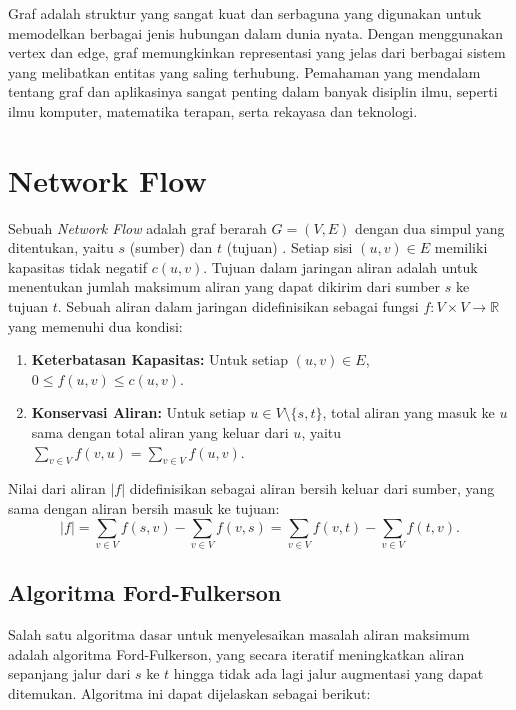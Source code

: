 Graf adalah struktur yang sangat kuat dan serbaguna yang digunakan untuk memodelkan berbagai jenis hubungan dalam dunia nyata. Dengan menggunakan vertex dan edge, graf memungkinkan representasi yang jelas dari berbagai sistem yang melibatkan entitas yang saling terhubung. Pemahaman yang mendalam tentang graf dan aplikasinya sangat penting dalam banyak disiplin ilmu, seperti ilmu komputer, matematika terapan, serta rekayasa dan teknologi.



\section{Network Flow}
\label{subsec:networkflow}

Sebuah \emph{Network Flow} adalah graf berarah \( G = (V, E) \) dengan dua simpul yang ditentukan, yaitu \( s \) (sumber) dan \( t \) (tujuan) \cite{moshkovitz2012algorithms}. Setiap sisi \( (u, v) \in E \) memiliki kapasitas tidak negatif \( c(u, v) \). Tujuan dalam jaringan aliran adalah untuk menentukan jumlah maksimum aliran yang dapat dikirim dari sumber \( s \) ke tujuan \( t \). Sebuah aliran dalam jaringan didefinisikan sebagai fungsi \( f : V \times V \rightarrow \mathbb{R} \) yang memenuhi dua kondisi:
\begin{enumerate}
    \item \textbf{Keterbatasan Kapasitas:} Untuk setiap \( (u, v) \in E \), \( 0 \leq f(u, v) \leq c(u, v) \).
    \item \textbf{Konservasi Aliran:} Untuk setiap \( u \in V \setminus \{s, t\} \), total aliran yang masuk ke \( u \) sama dengan total aliran yang keluar dari \( u \), yaitu \( \sum_{v \in V} f(v, u) = \sum_{v \in V} f(u, v) \).
\end{enumerate}

Nilai dari aliran \( |f| \) didefinisikan sebagai aliran bersih keluar dari sumber, yang sama dengan aliran bersih masuk ke tujuan:
\[
| f | = \sum_{v \in V} f(s, v) - \sum_{v \in V} f(v, s) = \sum_{v \in V} f(v, t) - \sum_{v \in V} f(t, v).
\]

\subsection{Algoritma Ford-Fulkerson}
\label{subsubsec:fordfulkerson}

Salah satu algoritma dasar untuk menyelesaikan masalah aliran maksimum adalah algoritma Ford-Fulkerson, yang secara iteratif meningkatkan aliran sepanjang jalur dari \( s \) ke \( t \) hingga tidak ada lagi jalur augmentasi yang dapat ditemukan. Algoritma ini dapat dijelaskan sebagai berikut:

